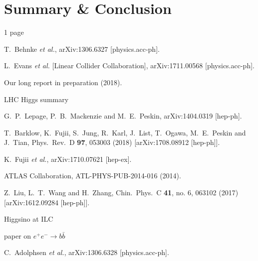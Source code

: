 \documentclass[%
 reprint,
 amsmath,amssymb,
 aps,
]{revtex4-1}
\def\ee{e^+e^-}
\begin{document}
\section{\label{sec:sum}Summary \& Conclusion} 

1 page


\begin{thebibliography}{99}
  T.~Behnke {\it et al.},
  arXiv:1306.6327 [physics.acc-ph].


  L.~Evans {\it et al.} [Linear Collider Collaboration],
  arXiv:1711.00568 [physics.acc-ph].


Our long report in preparation  (2018). 


LHC Higgs summary

  G.~P.~Lepage, P.~B.~Mackenzie and M.~E.~Peskin,
  arXiv:1404.0319 [hep-ph].

  T.~Barklow, K.~Fujii, S.~Jung, R.~Karl, J.~List, T.~Ogawa, M.~E.~Peskin and J.~Tian,
  Phys.\ Rev.\ D {\bf 97},  053003 (2018)
  [arXiv:1708.08912 [hep-ph]].
 
  K.~Fujii {\it et al.},
  arXiv:1710.07621 [hep-ex].


ATLAS Collaboration, ATL-PHYS-PUB-2014-016 (2014).

 Z.~Liu, L.~T.~Wang and H.~Zhang,
  Chin.\ Phys.\ C {\bf 41}, no. 6, 063102 (2017)
  [arXiv:1612.09284 [hep-ph]].



Higgsino at ILC


paper on $\ee\to b\bar b$



  C.~Adolphsen {\it et al.},
  arXiv:1306.6328 [physics.acc-ph].



\end{thebibliography}
\end{document}

